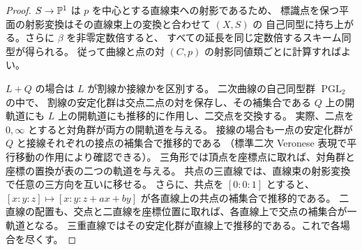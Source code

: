 \begin{proof}
$S\to\mathbb P^1$ は $p$ を中心とする直線束への射影であるため、
標識点を保つ平面の射影変換はその直線束上の変換と合わせて $(X,S)$ の
自己同型に持ち上がる。さらに $\beta$ を非零定数倍すると、
すべての延長を同じ定数倍するスキーム同型が得られる。
従って曲線と点の対 $(C,p)$ の射影同値類ごとに計算すればよい。

$L+Q$ の場合は $L$ が割線か接線かを区別する。
二次曲線の自己同型群 $\operatorname{PGL}_2$ の中で、
割線の安定化群は交点二点の対を保存し、その補集合である
$Q$ 上の開軌道にも $L$ 上の開軌道にも推移的に作用し、二交点を交換する。
実際、二点を $0,\infty$ とすると対角群が両方の開軌道を与える。
接線の場合も一点の安定化群が $Q$ と接線それぞれの接点の補集合で推移的である
（標準二次 Veronese 表現で平行移動の作用により確認できる）。
三角形では頂点を座標点に取れば、対角群と座標の置換が表の二つの軌道を与える。
共点の三直線では、直線束の射影変換で任意の三方向を互いに移せる。
さらに、共点を $[0:0:1]$ とすると、
$[x:y:z]\mapsto[x:y:z+ax+by]$ が各直線上の共点の補集合で推移的である。
二直線の配置も、交点と二直線を座標位置に取れば、各直線上で交点の補集合が一軌道となる。
三重直線ではその安定化群が直線上で推移的である。これで各場合を尽くす。


\end{proof}
